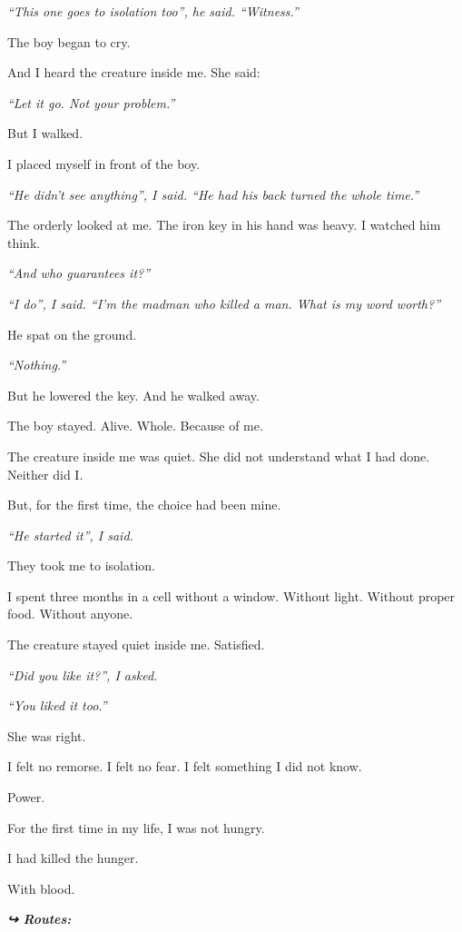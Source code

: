 \noindent \textit{\textquotedblleft{}This one goes to isolation too\textquotedblright{}\textit{, he said. }\textquotedblleft{}Witness.\textquotedblright{}}

\noindent The boy began to cry.

\noindent And I heard the creature inside me. She said:

\noindent \textit{\textquotedblleft{}Let it go. Not your problem.\textquotedblright{}}

\noindent But I walked.

\noindent I placed myself in front of the boy.

\noindent \textit{\textquotedblleft{}He didn't see anything\textquotedblright{}\textit{, I said. }\textquotedblleft{}He had his back turned the whole time.\textquotedblright{}}

\noindent The orderly looked at me. The iron key in his hand was heavy. I watched him think.

\noindent \textit{\textquotedblleft{}And who guarantees it?\textquotedblright{}}

\noindent \textit{\textquotedblleft{}I do\textquotedblright{}\textit{, I said. }\textquotedblleft{}I'm the madman who killed a man. What is my word worth?\textquotedblright{}}

\noindent He spat on the ground.

\noindent \textit{\textquotedblleft{}Nothing.\textquotedblright{}}

\noindent But he lowered the key. And he walked away.

\noindent The boy stayed. Alive. Whole. Because of me.

\noindent The creature inside me was quiet. She did not understand what I had done. Neither did I.

\noindent But, for the first time, the choice had been mine.

\noindent \textit{\textquotedblleft{}He started it\textquotedblright{}, I said.}

\noindent They took me to isolation.

\noindent I spent three months in a cell without a window. Without light. Without proper food. Without anyone.

\noindent The creature stayed quiet inside me. Satisfied.

\noindent \textit{\textquotedblleft{}Did you like it?\textquotedblright{}, I asked.}

\noindent \textit{\textquotedblleft{}You liked it too.\textquotedblright{}}

\noindent She was right.

\noindent I felt no remorse. I felt no fear. I felt something I did not know.

\noindent Power.

\noindent For the first time in my life, I was not hungry.

\noindent I had killed the hunger.

\noindent With blood.

\vspace{0.5em}
\noindent\textit{\textbf{↪ Routes:}  \rotasep {} \rotasep {}}
